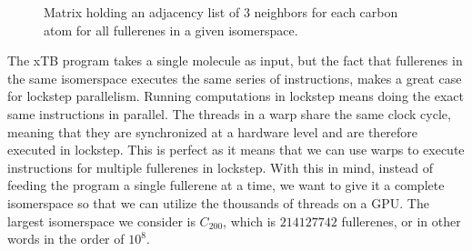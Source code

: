 \begin{figure}[H]
\begin{minipage}{.45\textwidth}
  \caption{Matrix holding an adjacency list of $3$ neighbors for each carbon atom for all fullerenes in a given isomerspace.}
  \label{fig:isomerspace_atom_neighbors}
\end{minipage}
\end{figure}


The xTB program takes a single molecule as input, but the fact that fullerenes in the same isomerspace executes the same series of instructions, makes a great case for lockstep parallelism. Running computations in lockstep means doing the exact same instructions in parallel. The threads in a warp share the same clock cycle, meaning that they are synchronized at a hardware level and are therefore executed in lockstep. This is perfect as it means that we can use warps to execute instructions for multiple fullerenes in lockstep. With this in mind, instead of feeding the program a single fullerene at a time, we want to give it a complete isomerspace so that we can utilize the thousands of threads on a GPU. The largest isomerspace we consider is $C_{200}$, which is $214127742$ fullerenes, or in other words in the order of $10^8$.

